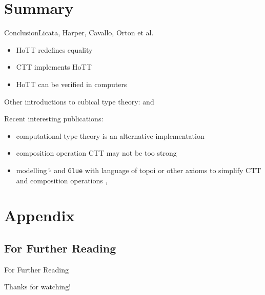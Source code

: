 \documentclass[english]{beamer}
\begin{document}
\section*{Summary}


\begin{frame}{Conclusion}{Licata, Harper, Cavallo, Orton et al.}
    
    
    \begin{itemize}
        \item HoTT redefines equality
        \item CTT implements HoTT
        \item HoTT can be verified in computers 
    \end{itemize}
    
    Other introductions to cubical type theory: \cite{Huber2016} and \cite{Orton2019}
    
    Recent interesting publications:
    \begin{itemize}
        \item computational type theory is an alternative implementation \cite{Angiuli2018}
        \item composition operation CTT may not be too strong \cite{Cavallo2019}
        \item modelling $\widehat{\square}$ and \texttt{Glue} with language of topoi or other axioms to simplify CTT and composition operations \cite{Orton2017}, \cite{Orton2019} 
    \end{itemize}
    
    
    \end{frame}





\appendix

\section*{Appendix}

\subsection*{For Further Reading}
\begin{frame}[allowframebreaks]{For Further Reading}

Thanks for watching!



\end{frame}
\end{document}
